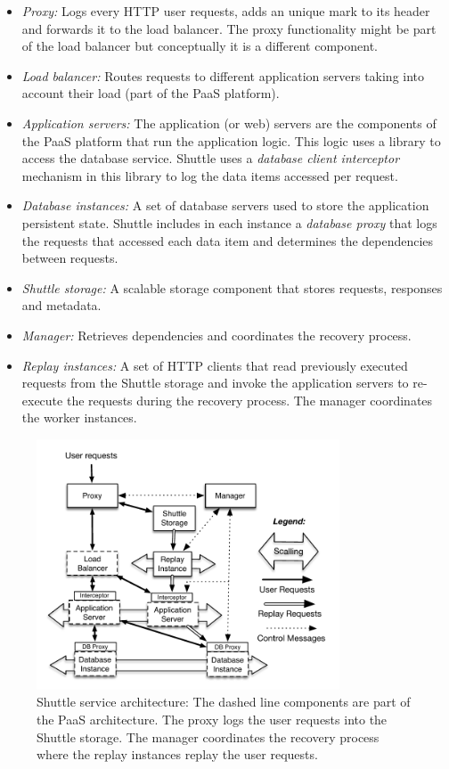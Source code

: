 \begin{itemize}
  \item \textit{Proxy:} Logs every \ac{HTTP} user requests, adds an unique mark to its header and forwards it to the load balancer. The proxy functionality might be part of the load balancer but conceptually it is a different component.%
  \item \textit{Load balancer:} Routes requests to different application servers taking into account their load (part of the \ac{PaaS} platform).
  \item \textit{Application servers:} The application (or web) servers are the components of the \ac{PaaS} platform that run the application logic. This logic uses a library to access the database service. Shuttle uses a \textit{database client interceptor} mechanism in this library to log the data items accessed per request.
  \item \textit{Database instances:} A set of database servers used to store the application persistent state. Shuttle includes in each instance  a \textit{database proxy} that logs the requests that accessed each data item and determines the dependencies between requests.
  \item \textit{Shuttle storage:} A scalable storage component that stores requests, responses and metadata.
  \item \textit{Manager:} Retrieves dependencies and coordinates the recovery process. 
  \item \textit{Replay instances:} A set of \ac{HTTP} clients that read previously executed requests from the Shuttle storage and invoke the application servers to re-execute the requests during the recovery process. The manager coordinates the worker instances.
  \end{itemize}

  \begin{figure}
  \centering
  \includegraphics[width=90mm]{images/architectureTiers}
  \caption[Shuttle service architecture]{Shuttle service architecture: The dashed line components are part of the \ac{PaaS} architecture. The proxy logs the user requests into the Shuttle storage. The manager coordinates the recovery process where the replay instances replay the user requests.}
  \label{fig:shuttle_architecture}
  \end{figure}

